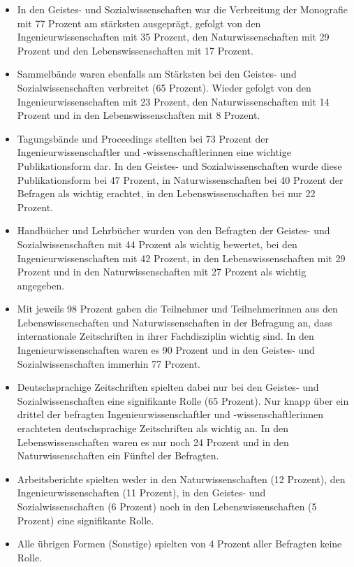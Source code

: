 \begin{itemize}
\item In den Geistes- und Sozialwissenschaften war die Verbreitung der Monografie mit 77 Prozent am stärksten ausgeprägt, gefolgt von den Ingenieurwissenschaften mit 35 Prozent, den Naturwissenschaften mit 29 Prozent und den Lebenswissenschaften mit 17 Prozent.
\item Sammelbände waren ebenfalls am Stärksten bei den Geistes- und Sozialwissenschaften verbreitet (65 Prozent). Wieder gefolgt von den Ingenieurwissenschaften mit 23 Prozent, den Naturwissenschaften mit 14 Prozent und in den Lebenswissenschaften mit 8 Prozent.
\item Tagungsbände und Proceedings stellten bei 73 Prozent der Ingenieurwissenschaftler und -wissenschaftlerinnen eine wichtige Publikationsform dar. In den Geistes- und Sozialwissenschaften  wurde diese Publikationsform bei 47 Prozent, in Naturwissenschaften bei 40 Prozent der Befragen als wichtig erachtet, in den Lebenswissenschaften bei nur 22 Prozent.
\item Handbücher und Lehrbücher wurden von den Befragten der Geistes- und Sozialwissenschaften mit 44 Prozent als wichtig bewertet, bei den Ingenieurwissenschaften mit 42 Prozent, in den Lebenswissenschaften mit 29 Prozent und in den Naturwissenschaften mit 27 Prozent als wichtig angegeben.
\item Mit jeweils 98 Prozent gaben die Teilnehmer und Teilnehmerinnen aus den Lebenswissenschaften und Naturwissenschaften in der Befragung an, dass internationale Zeitschriften in ihrer Fachdisziplin wichtig sind. In den Ingenieurwissenschaften waren es 90 Prozent und in den Geistes- und Sozialwissenschaften immerhin 77 Prozent.
\item Deutschsprachige Zeitschriften spielten dabei nur bei den Geistes- und Sozialwissenschaften eine signifikante Rolle (65 Prozent). Nur knapp über ein drittel der befragten Ingenieurwissenschaftler und -wissenschaftlerinnen erachteten deutschsprachige Zeitschriften als wichtig an. In den Lebenswissenschaften waren es nur noch 24 Prozent und in den Naturwissenschaften ein Fünftel der Befragten.
 \item  Arbeitsberichte spielten weder in den Naturwissenschaften (12 Prozent), den Ingenieurwissenschaften (11 Prozent), in den Geistes- und Sozialwissenschaften (6 Prozent) noch in den Lebenswissenschaften (5 Prozent) eine signifikante Rolle.
 \item Alle übrigen Formen (Sonstige) spielten von 4 Prozent aller Befragten keine Rolle.
 \end{itemize}

